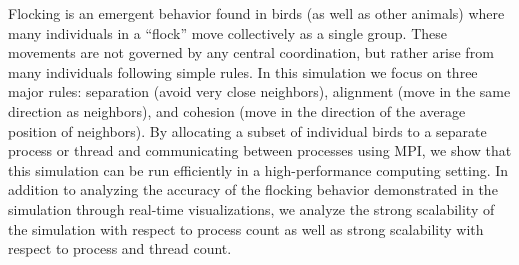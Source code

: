 Flocking is an emergent behavior found in birds (as well as other
animals) where many individuals in a “flock” move collectively as a
single group. These movements are not governed by any central
coordination, but rather arise from many individuals following simple
rules. In this simulation we focus on three major rules: separation
(avoid very close neighbors), alignment (move in the same direction as
neighbors), and cohesion (move in the direction of the average
position of neighbors). By allocating a subset of individual birds to
a separate process or thread and communicating between processes using
MPI, we show that this simulation can be run efficiently in a
high-performance computing setting. In addition to analyzing the
accuracy of the flocking behavior demonstrated in the simulation
through real-time visualizations, we analyze the strong scalability of
the simulation with respect to process count as well as strong
scalability with respect to process and thread count.
